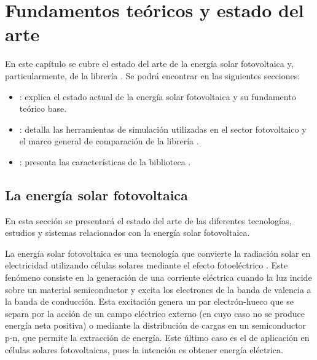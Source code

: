 \chapter{Fundamentos teóricos y estado del arte} \label{chp:state-of-the-art}

En este capítulo se cubre el estado del arte de la energía solar \gls{fotovoltaica} y, particularmente, de la \gls{librería} \pvlibpy{}. Se podrá encontrar en las siguientes secciones:

\begin{itemize}

      \item {}: explica el estado actual de la energía solar \gls{fotovoltaica} y su fundamento teórico base.

      \item {}: detalla las herramientas de \gls{simulación} utilizadas en el sector fotovoltaico y el marco general de comparación de la librería \pvlibpy{}.

      \item {}: presenta las características de la biblioteca \pvlibpy{}.

\end{itemize}


\section{La energía solar fotovoltaica} \label{sct:energia-solar}

En esta sección se presentará el estado del arte de las diferentes tecnologías, estudios y sistemas relacionados con la energía solar fotovoltaica.

La energía solar \gls{fotovoltaica} es una tecnología que convierte la \gls{radiación solar} en electricidad utilizando células solares mediante el \gls{efecto fotoeléctrico} \cite[][pp. 701-706]{böer2002survey}.
Este fenómeno consiste en la generación de una corriente eléctrica cuando la luz incide sobre un material \gls{semiconductor} y excita los electrones de la \gls{banda de valencia} a la \gls{banda de conducción}. Esta excitación genera un \gls{par electrón-hueco} que se separa por la acción de un campo eléctrico externo (en cuyo caso no se produce energía neta positiva) o mediante la distribución de cargas en un \gls{semiconductor} p-n, que permite la extracción de energía. Este último caso es el de aplicación en células solares fotovoltaicas, pues la intención es obtener energía eléctrica.

